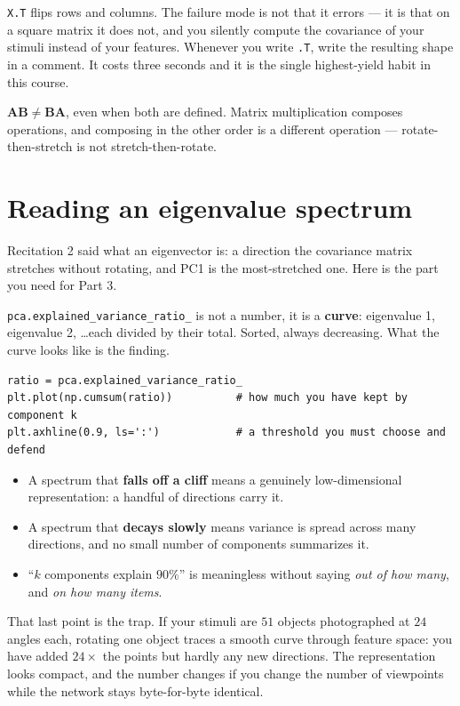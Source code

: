 \documentclass[11pt]{article}
\begin{document}
\texttt{X.T} flips rows and columns. The failure mode is not that it errors ---
it is that on a square matrix it does not, and you silently compute the
covariance of your stimuli instead of your features. Whenever you write
\texttt{.T}, write the resulting shape in a comment. It costs three seconds and
it is the single highest-yield habit in this course.

\begin{keybox}
 $\boldsymbol{A}\boldsymbol{B} \neq
\boldsymbol{B}\boldsymbol{A}$, even when both are defined. Matrix
multiplication composes operations, and composing in the other order is a
different operation --- rotate-then-stretch is not stretch-then-rotate.
\end{keybox}

\section{Reading an eigenvalue spectrum}

Recitation 2 said what an eigenvector is: a direction the covariance matrix
stretches without rotating, and PC1 is the most-stretched one. Here is the part
you need for Part 3.

\texttt{pca.explained\_variance\_ratio\_} is not a number, it is a
\textbf{curve}: eigenvalue 1, eigenvalue 2, \dots each divided by their total.
Sorted, always decreasing. What the curve looks like is the finding.

\begin{lstlisting}
ratio = pca.explained_variance_ratio_
plt.plot(np.cumsum(ratio))          # how much you have kept by component k
plt.axhline(0.9, ls=':')            # a threshold you must choose and defend
\end{lstlisting}

\begin{itemize}
  \item A spectrum that \textbf{falls off a cliff} means a genuinely
        low-dimensional representation: a handful of directions carry it.
  \item A spectrum that \textbf{decays slowly} means variance is spread across
        many directions, and no small number of components summarizes it.
  \item ``$k$ components explain $90\%$'' is meaningless without saying
        \emph{out of how many}, and \emph{on how many items}.
\end{itemize}

That last point is the trap. If your stimuli are $51$ objects photographed at
$24$ angles each, rotating one object traces a smooth curve through feature
space: you have added $24\times$ the points but hardly any new directions. The
representation looks compact, and the number changes if you change the number of
viewpoints while the network stays byte-for-byte identical.
\end{document}
